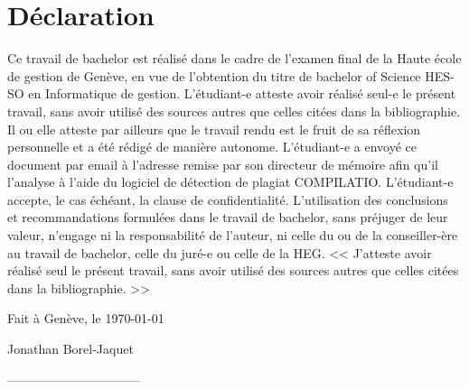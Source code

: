 \documentclass[12pt]{article}
\newcommand{\authorname}{Jonathan Borel-Jaquet}
\newcommand{\place}{Genève}
\let\stdsection\section
\renewcommand{\section}{\clearpage\stdsection}
\begin{document}
\newpage

\section{Déclaration}
Ce travail de bachelor est réalisé dans le cadre de l'examen final de la Haute école de gestion de Genève, en vue de l'obtention du titre de bachelor of Science HES-SO en Informatique de gestion.
\newline\newline
L'étudiant-e atteste avoir réalisé seul-e le présent travail, sans avoir utilisé des sources autres que celles citées dans la bibliographie.  Il ou elle atteste par ailleurs que le travail rendu est le fruit de sa réflexion personnelle et a été rédigé de manière autonome.
\newline\newline
L'étudiant-e a envoyé ce document par email à l'adresse remise par son directeur de mémoire afin qu'il l'analyse à l'aide du logiciel de détection de plagiat COMPILATIO.
\newline\newline
L'étudiant-e accepte, le cas échéant, la clause de confidentialité. L'utilisation des conclusions et recommandations formulées dans le travail de bachelor, sans préjuger de leur valeur, n'engage ni la responsabilité de l'auteur, ni celle du ou de la conseiller-ère au travail de bachelor, celle du juré-e ou celle de la HEG.
\newline\newline
<< J'atteste avoir réalisé seul le présent travail, sans avoir utilisé des sources autres que celles citées dans la bibliographie. >>
\vspace{4cm}
\begin{flushright}
    Fait à \place, le \today
\end{flushright}

\begin{flushright}
    \authorname
\end{flushright}
\vspace{1cm}
\begin{flushright}
    --------------------------------
\end{flushright}


\newpage
\end{document}
